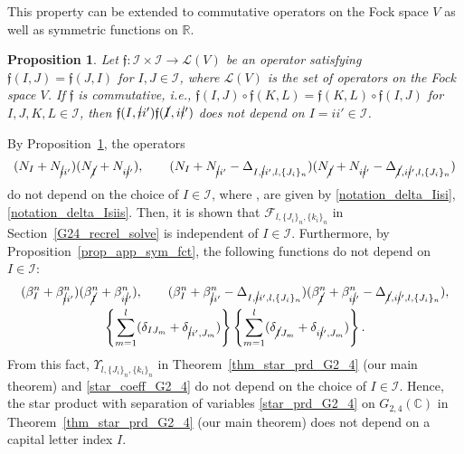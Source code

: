 \documentclass[10pt,a4paper]{amsart}
\numberwithin{equation}{section}
\newtheorem{Proposition}[Theorem]{Proposition}
 { \theoremstyle{definition}
\newtheorem{Definition}[Theorem]{Definition}
\newtheorem{Note}[Theorem]{Note}
\newtheorem{Example}[Theorem]{Example}
\newtheorem{Remark}[Theorem]{Remark} }
\begin{document}
This property can be extended to commutative operators on the Fock space $V$ as well as symmetric functions on $\mathbb{R}$.
\begin{Proposition}\label{cor_app_sym_opr}
Let
$
\mathfrak{f}\colon
\mathcal{I}
\times
\mathcal{I}
\to
\mathcal{L}(V)
$
be an operator satisfying
$
\mathfrak{f}(I,J)
=
\mathfrak{f}(J,I)
$
for
$
I,J
\in
\mathcal{I}
$,
where $\mathcal{L}(V)$ is the set of operators on the Fock space $V$.
If $\mathfrak{f}$ is commutative, i.e.,
$
\mathfrak{f}(I,J)
\circ
\mathfrak{f}(K,L)
=
\mathfrak{f}(K,L)
\circ
\mathfrak{f}(I,J)
$
for $I,J,K,L\in\mathcal{I}$, then
$
\mathfrak{f}(I,\cancel{i}i')
\mathfrak{f}(\cancel{I},i\cancel{i}')
$
does not depend on
$
I
=
ii'
\in
\mathcal{I}
$.
\end{Proposition}

By Proposition~\ref{cor_app_sym_opr}, the operators
\begin{align*}
 (
 N_{I}
 +
 N_{\cancel{i}i'}
 )
 (
 N_{\cancel{I}}
 +
 N_{i\cancel{i}'}
 ),
 \qquad
 (
 N_{I}
 +
 N_{\cancel{i}i'}
 -
 \Delta_{
 I,
 \cancel{i}i',
 l,
 \{
 J_{i}
 \}_{n}
 }
 )
 (
 N_{\cancel{I}}
 +
 N_{i\cancel{i}'}
 -
 \Delta_{
 \cancel{I},
 i\cancel{i}',
 l,
 \{
 J_{i}
 \}_{n}
 }
 )
\end{align*}
do not depend on the choice of $I\in\mathcal{I}$, where
,
are given by \eqref{notation_delta_Iisi}, \eqref{notation_delta_Isiis}. Then, it is shown that
$
\mathcal{F}_{
l,
\{
 J_{i}
\}_{n},
\{
 k_{i}
\}_{n}
}
$
in Section~\ref{G24_recrel_solve} is independent of
$
I
\in
\mathcal{I}
$.
Furthermore, by Proposition~\ref{prop_app_sym_fct}, the following functions do not depend on $I\in\mathcal{I}$:
\begin{gather*}
 (
\beta_{I}^{n}
+
\beta_{\cancel{i}i'}^{n}
 )
 (
\beta_{\cancel{I}}^{n}
+
\beta_{i\cancel{i}'}^{n}
 ),
\qquad
 (
\beta_{I}^{n}
+
\beta_{\cancel{i}i'}^{n}
-
\Delta_{
I,
\cancel{i}i',
l,
\{
J_{i}
\}_{n}
}
 )
 (
\beta_{\cancel{I}}^{n}
+
\beta_{i\cancel{i}'}^{n}
-
\Delta_{
\cancel{I},
i\cancel{i}',
l,
\{
J_{i}
\}_{n}
}
 ),
\\
\left\{
\sum_{m=1}^{l}
 (
\delta_{IJ_{m}}
+
\delta_{\cancel{i}i',J_{m}}
 )
\right\}
\left\{
\sum_{m=1}^{l}
 (
\delta_{\cancel{I}J_{m}}
+
\delta_{i\cancel{i}',J_{m}}
 )
\right\}.
\end{gather*}
From this fact,
$
\Upsilon_{
l,
\{J_{i}\}_{n},
\{k_{i}\}_{n}
}
$
in Theorem~\ref{thm_star_prd_G2_4} (our main theorem) and \eqref{star_coeff_G2_4}
do not depend on the choice of
$
I
\in
\mathcal{I}
$.
Hence, the star product with separation of variables \eqref{star_prd_G2_4} on $G_{2,4}(\mathbb{C})$ in Theorem~\ref{thm_star_prd_G2_4} (our main theorem) does not depend on a capital letter index $I$.
\end{document}

